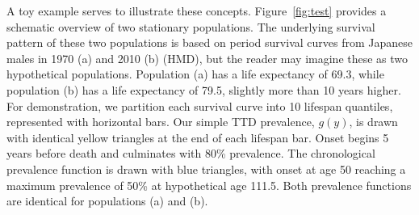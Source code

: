 \documentclass[11pt,oneside,a4paper]{article} %
\begin{document}
A toy example serves to illustrate these concepts. Figure~\ref{fig:test}
provides a schematic overview of two stationary populations. The
underlying survival pattern of these two populations is based on period survival
curves from Japanese males in 1970 (a) and 2010 (b) (HMD), but the reader may
imagine these as two hypothetical populations. Population (a) has a life
expectancy of 69.3, while population (b) has a life expectancy of 79.5, slightly
more than 10 years higher. For demonstration, we partition each survival curve
into 10 lifespan quantiles, represented with horizontal bars. Our simple
TTD prevalence, $g(y)$, is drawn with identical yellow triangles at
the end of each lifespan bar. Onset begins 5 years before death and culminates with 80\%
prevalence. The chronological prevalence function is drawn with blue triangles,
with onset at age 50 reaching a maximum prevalence of 50\% at hypothetical age
111.5. Both prevalence functions are identical for populations (a) and (b). 
\end{document}
